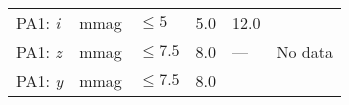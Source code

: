 \documentclass[DM,lsstdraft,toc]{lsstdoc}
\begin{document}
\begin{longtable}[]{@{}llllll@{}}
\begin{minipage}[t]{0.14\columnwidth}
PA1: \emph{i}\strut
\end{minipage} & \begin{minipage}[t]{0.06\columnwidth}\raggedright\strut
mmag\strut
\end{minipage} & \begin{minipage}[t]{0.17\columnwidth}\raggedright\strut
\(\leq 5\)\strut
\end{minipage} & \begin{minipage}[t]{0.17\columnwidth}\raggedright\strut
5.0\strut
\end{minipage} & \begin{minipage}[t]{0.12\columnwidth}\raggedright\strut
12.0\strut
\end{minipage} & \begin{minipage}[t]{0.17\columnwidth}\raggedright\strut
\strut
\end{minipage}\tabularnewline
\begin{minipage}[t]{0.14\columnwidth}\raggedright\strut
PA1: \emph{z}\strut
\end{minipage} & \begin{minipage}[t]{0.06\columnwidth}\raggedright\strut
mmag\strut
\end{minipage} & \begin{minipage}[t]{0.17\columnwidth}\raggedright\strut
\(\leq 7.5\)\strut
\end{minipage} & \begin{minipage}[t]{0.17\columnwidth}\raggedright\strut
8.0\strut
\end{minipage} & \begin{minipage}[t]{0.12\columnwidth}\raggedright\strut
---\strut
\end{minipage} & \begin{minipage}[t]{0.17\columnwidth}\raggedright\strut
No data\strut
\end{minipage}\tabularnewline
\begin{minipage}[t]{0.14\columnwidth}\raggedright\strut
PA1: \emph{y}\strut
\end{minipage} & \begin{minipage}[t]{0.06\columnwidth}\raggedright\strut
mmag\strut
\end{minipage} & \begin{minipage}[t]{0.17\columnwidth}\raggedright\strut
\(\leq 7.5\)\strut
\end{minipage} & \begin{minipage}[t]{0.17\columnwidth}\raggedright\strut
8.0\strut
\end{minipage} & \begin{minipage}[t]{0.12\columnwidth}\raggedright\strut

\end{minipage}
\end{longtable}
\end{document}
